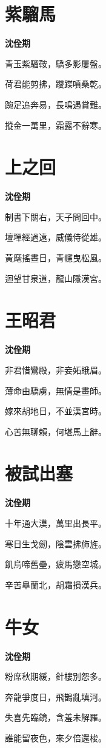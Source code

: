 \documentclass[12pt,a4paper]{ctexbook}
\begin{document}
\section{紫騮馬}
\textbf{沈佺期}\par\vspace{0.5em}
青玉紫騮鞍，驕多影屢盤。\par
荷君能剪拂，躞蹀噴桑乾。\par
踠足追奔易，長鳴遇賞難。\par
摐金一萬里，霜露不辭寒。\par

\section{上之回}
\textbf{沈佺期}\par\vspace{0.5em}
制書下關右，天子問回中。\par
壇墠經過遠，威儀侍從雄。\par
黃麾搖晝日，青幰曳松風。\par
迴望甘泉道，龍山隱漢宮。\par

\section{王昭君}
\textbf{沈佺期}\par\vspace{0.5em}
非君惜鸞殿，非妾妬蛾眉。\par
薄命由驕虜，無情是畫師。\par
嫁來胡地日，不並漢宮時。\par
心苦無聊賴，何堪馬上辭。\par

\section{被試出塞}
\textbf{沈佺期}\par\vspace{0.5em}
十年通大漠，萬里出長平。\par
寒日生戈劒，陰雲拂斾旌。\par
飢烏啼舊壘，疲馬戀空城。\par
辛苦臯蘭北，胡霜損漢兵。\par

\section{牛女}
\textbf{沈佺期}\par\vspace{0.5em}
粉席秋期緩，針樓別怨多。\par
奔龍爭度日，飛鵲亂填河。\par
失喜先臨鏡，含羞未解羅。\par
誰能留夜色，來夕倍還梭。\par
\end{document}
